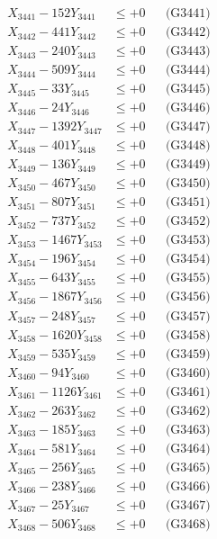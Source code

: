 \documentclass[a4paper,10pt]{article}
\begin{document}
{\begin{align}
\allowbreak
X_{3441} - 152Y_{3441} &\leq +0 && \text{(G3441)} \\
X_{3442} - 441Y_{3442} &\leq +0 && \text{(G3442)} \\
X_{3443} - 240Y_{3443} &\leq +0 && \text{(G3443)} \\
X_{3444} - 509Y_{3444} &\leq +0 && \text{(G3444)} \\
X_{3445} - 33Y_{3445} &\leq +0 && \text{(G3445)} \\
X_{3446} - 24Y_{3446} &\leq +0 && \text{(G3446)} \\
X_{3447} - 1392Y_{3447} &\leq +0 && \text{(G3447)} \\
X_{3448} - 401Y_{3448} &\leq +0 && \text{(G3448)} \\
X_{3449} - 136Y_{3449} &\leq +0 && \text{(G3449)} \\
X_{3450} - 467Y_{3450} &\leq +0 && \text{(G3450)} \\
\allowbreak
X_{3451} - 807Y_{3451} &\leq +0 && \text{(G3451)} \\
X_{3452} - 737Y_{3452} &\leq +0 && \text{(G3452)} \\
X_{3453} - 1467Y_{3453} &\leq +0 && \text{(G3453)} \\
X_{3454} - 196Y_{3454} &\leq +0 && \text{(G3454)} \\
X_{3455} - 643Y_{3455} &\leq +0 && \text{(G3455)} \\
X_{3456} - 1867Y_{3456} &\leq +0 && \text{(G3456)} \\
X_{3457} - 248Y_{3457} &\leq +0 && \text{(G3457)} \\
X_{3458} - 1620Y_{3458} &\leq +0 && \text{(G3458)} \\
X_{3459} - 535Y_{3459} &\leq +0 && \text{(G3459)} \\
X_{3460} - 94Y_{3460} &\leq +0 && \text{(G3460)} \\
\allowbreak
X_{3461} - 1126Y_{3461} &\leq +0 && \text{(G3461)} \\
X_{3462} - 263Y_{3462} &\leq +0 && \text{(G3462)} \\
X_{3463} - 185Y_{3463} &\leq +0 && \text{(G3463)} \\
X_{3464} - 581Y_{3464} &\leq +0 && \text{(G3464)} \\
X_{3465} - 256Y_{3465} &\leq +0 && \text{(G3465)} \\
X_{3466} - 238Y_{3466} &\leq +0 && \text{(G3466)} \\
X_{3467} - 25Y_{3467} &\leq +0 && \text{(G3467)} \\
X_{3468} - 506Y_{3468} &\leq +0 && \text{(G3468)} \\

\end{align}}
\end{document}
